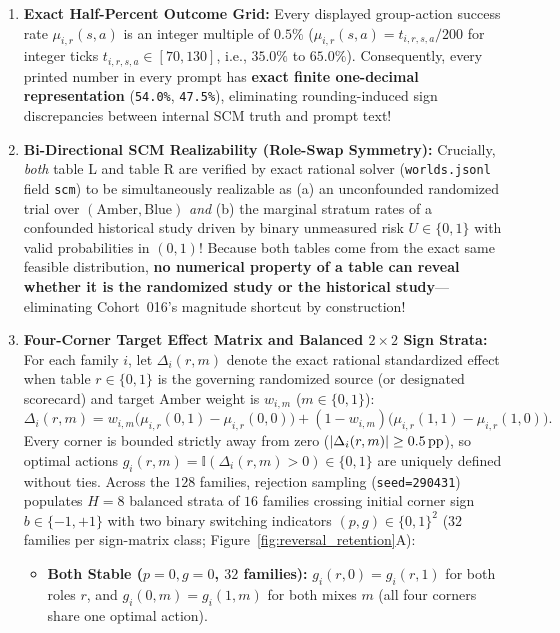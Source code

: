 \begin{enumerate}
  \item \textbf{Exact Half-Percent Outcome Grid:} Every displayed group-action success rate $\mu_{i,r}(s,a)$ is an integer multiple of $0.5\%$ ($\mu_{i,r}(s,a) = t_{i,r,s,a} / 200$ for integer ticks $t_{i,r,s,a} \in [70, 130]$, i.e., $35.0\%$ to $65.0\%$). Consequently, every printed number in every prompt has \textbf{exact finite one-decimal representation} (\texttt{54.0\%}, \texttt{47.5\%}), eliminating rounding-induced sign discrepancies between internal SCM truth and prompt text!
  \item \textbf{Bi-Directional SCM Realizability (Role-Swap Symmetry):} Crucially, \emph{both} table L and table R are verified by exact rational solver (\texttt{worlds.jsonl} field \texttt{scm}) to be simultaneously realizable as (a) an unconfounded randomized trial over $(\text{Amber}, \text{Blue})$ \emph{and} (b) the marginal stratum rates of a confounded historical study driven by binary unmeasured risk $U \in \{0,1\}$ with valid probabilities in $(0,1)$! Because both tables come from the exact same feasible distribution, \textbf{no numerical property of a table can reveal whether it is the randomized study or the historical study}---eliminating Cohort~016's magnitude shortcut by construction!
  \item \textbf{Four-Corner Target Effect Matrix and Balanced $2\times 2$ Sign Strata:} For each family $i$, let $\Delta_{i}(r, m)$ denote the exact rational standardized effect when table $r \in \{0,1\}$ is the governing randomized source (or designated scorecard) and target Amber weight is $w_{i,m}$ ($m \in \{0,1\}$):
  \begin{equation}
    \Delta_{i}(r, m) = w_{i,m}\bigl(\mu_{i,r}(0,1) - \mu_{i,r}(0,0)\bigr) + (1 - w_{i,m})\bigl(\mu_{i,r}(1,1) - \mu_{i,r}(1,0)\bigr).
    \label{eq:cftp1_corners}
  \end{equation}
  Every corner is bounded strictly away from zero ($|\Delta_i(r,m)| \ge 0.5\,\mathrm{pp}$), so optimal actions $g_i(r,m) = \mathbb{I}(\Delta_i(r,m) > 0) \in \{0,1\}$ are uniquely defined without ties. Across the $128$ families, rejection sampling (\texttt{seed=290431}) populates $H=8$ balanced strata of $16$ families crossing initial corner sign $b \in \{-1, +1\}$ with two binary switching indicators $(p, g) \in \{0,1\}^2$ ($32$ families per sign-matrix class; Figure~\ref{fig:reversal_retention}A):
  \begin{itemize}
    \item \textbf{Both Stable ($p=0, g=0$, $32$ families):} $g_i(r,0) = g_i(r,1)$ for both roles $r$, and $g_i(0,m) = g_i(1,m)$ for both mixes $m$ (all four corners share one optimal action).

\end{itemize}
\end{enumerate}
